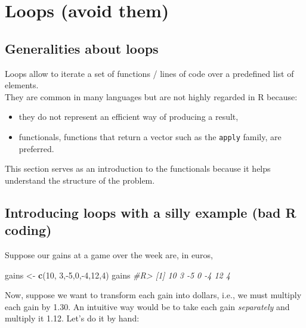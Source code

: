 \documentclass[]{book}
\newenvironment{Shaded}{}{}
\newcommand{\CommentTok}[1]{\textcolor[rgb]{0.38,0.63,0.69}{\textit{#1}}}
\newcommand{\DecValTok}[1]{\textcolor[rgb]{0.25,0.63,0.44}{#1}}
\newcommand{\KeywordTok}[1]{\textcolor[rgb]{0.00,0.44,0.13}{\textbf{#1}}}
\newcommand{\NormalTok}[1]{#1}
\newcommand{\OperatorTok}[1]{\textcolor[rgb]{0.40,0.40,0.40}{#1}}
\newcommand{\StringTok}[1]{\textcolor[rgb]{0.25,0.44,0.63}{#1}}
\providecommand{\tightlist}{%
  \setlength{\itemsep}{0pt}\setlength{\parskip}{0pt}}
\theoremstyle{definition}
\theoremstyle{definition}
\theoremstyle{definition}
\theoremstyle{remark}
\begin{document}
\hypertarget{loops}{%
\chapter{Loops (avoid them)}\label{loops}}

\hypertarget{generalities-about-loops}{%
\section{Generalities about loops}\label{generalities-about-loops}}

Loops allow to iterate a set of functions / lines of code over a
predefined list of elements.\\
They are common in many languages but are not highly regarded in R
because:

\begin{itemize}
\tightlist
\item
  they do not represent an efficient way of producing a result,
\item
  functionals, functions that return a vector such as the \texttt{apply}
  family, are preferred.
\end{itemize}

This section serves as an introduction to the functionals because it
helps understand the structure of the problem.

\hypertarget{introducing-loops-with-a-silly-example-bad-r-coding}{%
\section{Introducing loops with a silly example (bad R
coding)}\label{introducing-loops-with-a-silly-example-bad-r-coding}}

Suppose our gains at a game over the week are, in euros,

\begin{Shaded}
\begin{Highlighting}[]
\NormalTok{gains <-}\StringTok{ }\KeywordTok{c}\NormalTok{(}\DecValTok{10}\NormalTok{, }\DecValTok{3}\NormalTok{,}\OperatorTok{-}\DecValTok{5}\NormalTok{,}\DecValTok{0}\NormalTok{,}\OperatorTok{-}\DecValTok{4}\NormalTok{,}\DecValTok{12}\NormalTok{,}\DecValTok{4}\NormalTok{)}
\NormalTok{gains}
\CommentTok{#R> [1] 10  3 -5  0 -4 12  4}
\end{Highlighting}
\end{Shaded}

Now, suppose we want to transform each gain into dollars, i.e., we must
multiply each gain by 1.30. An intuitive way would be to take each gain
\emph{separately} and multiply it 1.12. Let's do it by hand:
\end{document}
